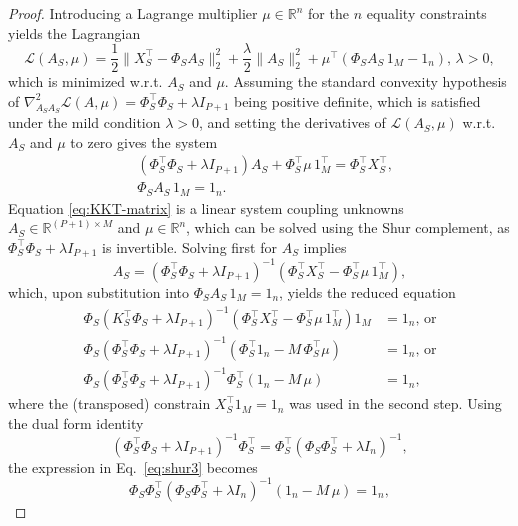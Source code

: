 \documentclass{article}
\begin{document}
\begin{proof}
Introducing a Lagrange multiplier $\mu\in\mathbb{R}^n$ for the $n$ equality constraints yields the Lagrangian
\begin{equation}
\mathcal{L}(A_S,\mu) = \frac{1}{2}\|X^{\top}_S-\Phi_S A_S\|^2_2 + \frac{\lambda}{2}\|A_S\|^2_2 + \mu^\top (\Phi_S A_S\,1_M -1_n), \, \lambda>0,
\end{equation}
which is minimized w.r.t. $A_S$ and $\mu$. Assuming the standard convexity hypothesis of $\nabla^2_{A_S A_S}\mathcal{L}(A,\mu)=\Phi_S^\top \Phi_S + \lambda I_{P+1}$ being positive definite, which is satisfied under the mild condition $\lambda>0$, and setting the derivatives of $\mathcal{L}(A_S,\mu)$ w.r.t. $A_S$ and $\mu$ to zero gives the system  
\begin{equation}
\label{eq:KKT-matrix}
\begin{aligned}
&(\Phi_S^\top \Phi_S + \lambda I_{P+1}) A_S + \Phi_S^\top \mu\,1_M^\top = \Phi_S^\top X^{\top}_S,\\
& \Phi_S A_S\,1_M =1_n.
\end{aligned}
\end{equation}
Equation \eqref{eq:KKT-matrix} is a linear system coupling unknowns $A_S\in\mathbb{R}^{(P+1)\times M}$ and $\mu\in\mathbb{R}^n$, which can be solved using the Shur complement, as $\Phi_S^\top \Phi_S + \lambda I_{P+1}$ is invertible. Solving first for $A_S$ implies
\begin{equation}
    A_S=(\Phi_S^\top \Phi_S + \lambda I_{P+1})^{-1}(\Phi_S^\top X^{\top}_S-\Phi_S^\top \mu\,1_M^\top),
    \label{eq:ShurA}
\end{equation}
which, upon substitution into $\Phi_S A_S\,1_M =1_n$, yields the reduced equation
\begin{align}
    \Phi_S(K_S^\top \Phi_S + \lambda I_{P+1})^{-1}(\Phi_S^\top X^{\top}_S-\Phi_S^\top \mu\,1_M^\top)1_M & = 1_n, \, \mbox{or} \nonumber \\
    \Phi_S(\Phi_S^\top \Phi_S + \lambda I_{P+1})^{-1}(\Phi_S^\top 1_n-M\,\Phi_S^\top \mu) & = 1_n, \, \mbox{or} \nonumber \\
    \Phi_S(\Phi_S^\top \Phi_S + \lambda I_{P+1})^{-1}\Phi_S^\top( 1_n-M\,\mu) & =1_n,
   \label{eq:shur3}
\end{align}
where the (transposed) constrain $X_S^\top 1_M=1_n$ was used in the second step. Using the dual form identity
\begin{equation}
    (\Phi_S^\top \Phi_S + \lambda I_{P+1})^{-1}\Phi_S^\top=\Phi_S^\top(\Phi_S \Phi_S^\top + \lambda I_n)^{-1},
    \label{eq:dual_identity}
\end{equation}
the expression in Eq.~\eqref{eq:shur3} becomes
\begin{equation}
\Phi_S\Phi_S^\top(\Phi_S \Phi_S^\top + \lambda I_n)^{-1}( 1_n-M\,\mu) =1_n,
   \label{eq:shur4}
\end{equation}


\end{proof}
\end{document}
